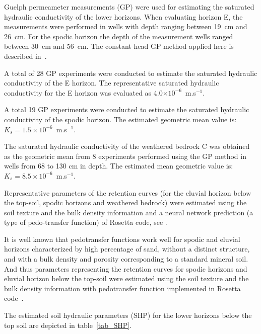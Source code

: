 \documentclass[review]{elsarticle}
\begin{document}
Guelph permeameter measurements (GP) were used for estimating the saturated hydraulic conductivity of the lower horizons. When evaluating horizon E, the measurements were performed in wells with depth ranging between 19~cm  and 26~cm. For the spodic horizon the depth of the measurement wells ranged between 30~cm  and 56~cm. The constant head GP method applied here is described in~\citep{Jacka1}.

A total of 28 GP experiments were conducted to estimate the saturated hydraulic conductivity of the E horizon. 
 The representative saturated hydraulic conductivity for the E horizon was evaluated as 4.0$\times 10^{-6}$~m.s$^{-1}$.


A total 19 GP experiments were conducted to estimate the saturated hydraulic conductivity of the spodic horizon. The estimated geometric mean value is: $K_s =  1.5\times 10^{-6}$~m.s$^{-1}$.

The saturated hydraulic conductivity of the weathered
bedrock C was obtained as the geometric mean  from 8 experiments performed using the GP method  in wells from 68 to 130 cm in depth. The estimated mean geometric value is: $K_s =  8.5\times 10^{-6}$~m.s$^{-1}$.

Representative parameters of the retention curves (for the eluvial horizon below the top-soil, spodic horizons and weathered bedrock) were estimated using the soil texture and the bulk density information and a neural network prediction (a type of pedo-transfer function) of Rosetta code, see \citep{Schaap}. 

It is well known that pedotransfer functions work well for spodic and eluvial horizons characterized by high percentage of sand, without a distinct structure, and with a bulk density and porosity corresponding to a standard mineral soil. And thus parameters representing the retention curves for spodic horizons and eluvial horizon below the top-soil were estimated using the soil texture and the bulk density information with pedotransfer function implemented in Rosetta code~\citep{Schaap}.

The estimated soil hydraulic parameters (SHP) for the lower horizons below the top soil are depicted in table~\ref{tab_SHP}.
\end{document}
